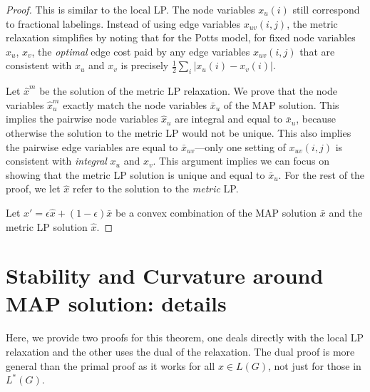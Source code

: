 \begin{proof}
This is similar to the local LP. The node variables $x_u(i)$ still correspond to fractional labelings. Instead of using edge variables $x_{uv}(i,j)$, the metric relaxation simplifies by noting that for the Potts model, for fixed node variables $x_u$, $x_v$, the \emph{optimal} edge cost paid by any edge variables $x_{uv}(i,j)$ that are consistent with $x_u$ and $x_v$ is precisely $\frac{1}{2}\sum_i|x_u(i) - x_v(i)|$.

Let $\hat{x}^m$ be the solution of the metric LP relaxation. We prove that the node variables $\hat{x}^m_u$ exactly match the node variables $\bar{x}_u$ of the MAP solution.
This implies the pairwise node variables $\hat{x}_u$ are integral and equal to $\bar{x}_u$, because otherwise the solution to the metric LP would not be unique. 
This also implies the pairwise edge variables are equal to $\bar{x}_{uv}$---only one setting of $x_{uv}(i,j)$ is consistent with \emph{integral} $x_u$ and $x_v$.
This argument implies we can focus on showing that the metric LP solution is unique and equal to $\bar{x}_u$.
For the rest of the proof, we let $\hat{x}$ refer to the solution to the \emph{metric} LP. 

Let $x' = \epsilon\hat{x} + (1-\epsilon)\bar{x}$ be a convex combination of the MAP solution $\bar{x}$ and the metric LP solution $\hat{x}$. 
\fi

\end{proof}

\section{Stability and Curvature around MAP solution: details}\label{sec:stable-curvature_details}
\curvature*

Here, we provide two proofs for this theorem, one deals directly with the local LP relaxation and the other uses the dual of the relaxation. The dual proof is more general than the primal proof as it works for all $x \in L(G)$, not just for those in $L^*(G)$.

